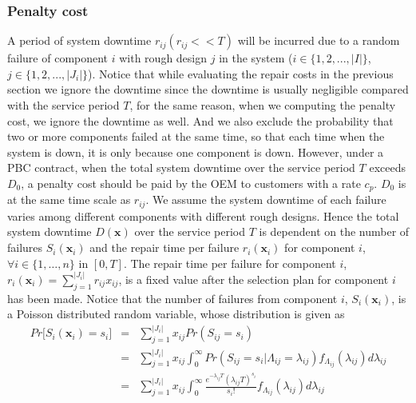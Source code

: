 \documentclass[preprint,12pt]{elsarticle}
\begin{document}
\subsubsection{Penalty cost}
A period of system downtime $r_{ij}(r_{ij}<<T)$ will be incurred due to a random failure of component $i$ with rough design $j$ in the system ($i \in \{1,2,...,\rvert I \lvert \}$, $j \in \{1,2,...,\rvert J_{i} \lvert \}$).
Notice that while evaluating the repair costs in the previous section we ignore the downtime since the downtime is usually negligible compared with the service period $T$, for the same reason, when we computing the penalty cost, we ignore the downtime as well. And we also exclude the probability that two or more components failed at the same time, so that each time when the system is down, it is only because one component is down.
However, under a PBC contract, when the total system downtime over the service period $T$ exceeds $D_0$, a penalty cost should be paid by the OEM to customers with a rate $c_p$. $D_0$ is at the same time scale as $r_{ij}$. We assume the system downtime of each failure varies among different components with different rough designs. Hence the total system downtime $D{(\boldsymbol{x})}$ over the service period $T$ is dependent on the number of failures $S_{i}(\boldsymbol{x}_{i})$ and the repair time per failure $r_{i}(\boldsymbol{x}_{i})$ for component $i$,$\forall i\in \{1,\dots,n\}$ in $[0,T]$. The repair time per failure for component $i$, $r_{i}(\boldsymbol{x}_{i})=\sum_{j=1}^{\rvert J_{i} \lvert}{r_{ij}x_{ij}}$, is a fixed value after the selection plan for component $i$ has been made. Notice that the number of failures from component $i$, $S_{i}(\boldsymbol{x}_{i})$, is a Poisson distributed random variable, whose distribution is given as
\begin{eqnarray}
Pr\bigg[S_{i}(\boldsymbol{x}_{i})=s_{i}\bigg] &=&\sum^{\rvert J_{i} \lvert}_{j=1}{x_{ij}Pr(S_{ij}=s_{i})} \nonumber\\
&=&\sum^{\rvert J_{i} \lvert}_{j=1}{x_{ij}\int^{\infty}_{0}Pr(S_{ij}=s_{i}|\Lambda_{ij}=\lambda_{ij})f_{\Lambda_{ij}}(\lambda_{ij})d\lambda_{ij}} \nonumber\\
&=&\sum^{\rvert J_{i} \lvert}_{j=1}{x_{ij}\int^{\infty}_{0}{\frac{e^{-\lambda_{ij}T}(\lambda_{ij}T)^{s_{i}}}{s_{i}!}f_{\Lambda_{ij}}(\lambda_{ij})}d\lambda_{ij}}
\end{eqnarray}
\end{document}
